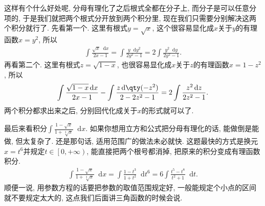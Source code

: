 \documentclass{ctexbook}
\newcommand*{\dif}{\mathop{}\!\mathrm{d}}
\begin{document}
{这样有个什么好处呢, 分母有理化了之后根式全都在分子上, 而分子是可以任意分项的, 于是我们就把两个根式分开放到两个积分里, 现在我们只需要分别解决这两个积分就行了. 先看第一个. 这里有根式$y=\sqrt{x}$, 这个很容易显化成$x$关于$y$的有理函数$x=y^{2}$, 所以
\begin{align*}
\int\frac{\sqrt{x}\dif{x}}{2x-1}=\int\frac{y\dif{y^{2}}}{2y^{2}-1}=2\int\frac{y^{2}\dif{y}}{2y^{2}-1}
.\end{align*}
再看第二个. 这里有根式$z=\sqrt{1-x}$, 也很容易显化成$x$关于$z$的有理函数$x=1-z^{2}$, 所以
\begin{align*}
\int\frac{\sqrt{1-x}\dif{x}}{2x-1}-\int\frac{z\dif{\qty(-z^{2})}}{2-2z^{2}-1}=2\int\frac{z^{2}\dif{z}}{2z^{2}-1}
.\end{align*}
两个积分都求出来之后, 分别回代化成关于$x$的形式就可以了. \par
最后来看积分$\int\frac{1-\sqrt{x}}{1+\sqrt[3]{x}}\dif{x}$. 如果你想用立方和公式把分母有理化的话, 能做倒是能做, 但太复杂了. 还是那句话, 适用范围广的做法未必就快. 这题最快的方式是换元$x=t^{6}$并规定$t\in\left[0,+\infty\right)$, 能直接把两个根号都消掉, 把原来的积分变成有理函数积分. 
\begin{align*}
\int\frac{1-\sqrt{x}}{1+\sqrt[3]{x}}\dif{x}=\int\frac{1-t^{3}}{1+t^{2}}\dif{t^{6}}=6\int\frac{t^{5}-t^{8}}{t^{2}+1}\dif{t}
.\end{align*}
顺便一说, 用参数方程的话要把参数的取值范围规定好, 一般能规定个小点的区间就不要规定太大的, 这点我们后面讲三角函数的时候会说. \par
}
\end{document}
